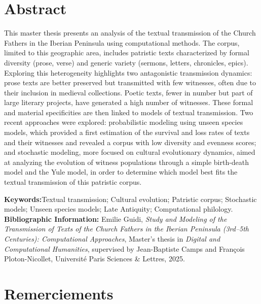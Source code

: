 \documentclass[a4paper,twoside,12pt]{book}
\begin{document}

\section*{Abstract}

This master thesis presents an analysis of the textual transmission of the Church Fathers in the Iberian Peninsula using computational methods. The corpus, limited to this geographic area, includes patristic texts characterized by formal diversity (prose, verse) and generic variety (sermons, letters, chronicles, epics). Exploring this heterogeneity highlights two antagonistic transmission dynamics: prose texts are better preserved but transmitted with few witnesses, often due to their inclusion in medieval collections. Poetic texts, fewer in number but part of large literary projects, have generated a high number of witnesses. These formal and material specificities are then linked to models of textual transmission. Two recent approaches were explored: probabilistic modeling using unseen species models, which provided a first estimation of the survival and loss rates of texts and their witnesses and revealed a corpus with low diversity and evenness scores; and stochastic modeling, more focused on cultural evolutionary dynamics, aimed at analyzing the evolution of witness populations through a simple birth-death model and the Yule model, in order to determine which model best fits the textual transmission of this patristic corpus.

\medskip

\textbf{Keywords:}Textual transmission; Cultural evolution; Patristic corpus; Stochastic models; Unseen species models; Late Antiquity; Computational philology.\\

\textbf{Bibliographic Information:} Emilie Guidi, \textit{Study and Modeling of the Transmission of Texts of the Church Fathers in the Iberian Peninsula (3rd–5th Centuries): Computational Approaches}, Master’s thesis in \textit{Digital and Computational Humanities}, supervised by Jean-Baptiste Camps and François Ploton-Nicollet, Université Paris Sciences \& Lettres, 2025.


\clearpage
\thispagestyle{empty}
\cleardoublepage


\section*{Remerciements}
\end{document}
